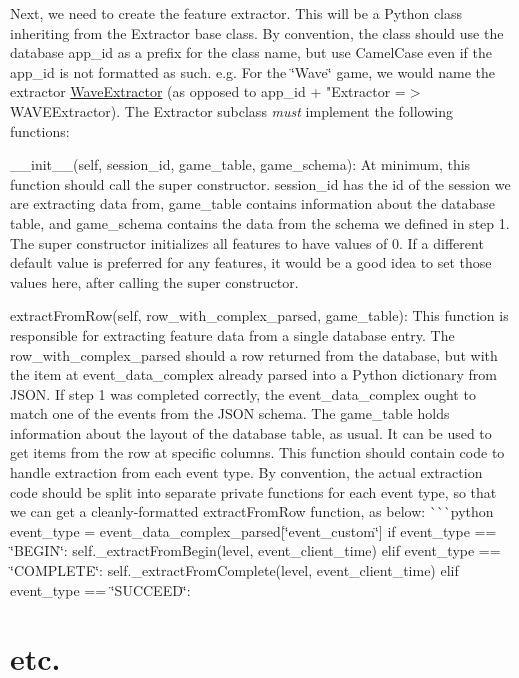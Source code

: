\begin{DoxyEnumerate}
\item Next, we need to create the feature extractor. This will be a Python class inheriting from the {\ttfamily Extractor} base class. By convention, the class should use the database app\+\_\+id as a prefix for the class name, but use Camel\+Case even if the app\+\_\+id is not formatted as such. e.\+g. For the \char`\"{}\+Wave\char`\"{} game, we would name the extractor {\ttfamily \mbox{\hyperlink{class_wave_extractor}{Wave\+Extractor}}} (as opposed to {\ttfamily app\+\_\+id + "Extractor} =$>$ {\ttfamily W\+A\+V\+E\+Extractor}). The {\ttfamily Extractor} subclass {\itshape must} implement the following functions\+:
\begin{DoxyItemize}
\item {\ttfamily \+\_\+\+\_\+init\+\_\+\+\_\+(self, session\+\_\+id, game\+\_\+table, game\+\_\+schema)}\+: At minimum, this function should call the super constructor. {\ttfamily session\+\_\+id} has the id of the session we are extracting data from, {\ttfamily game\+\_\+table} contains information about the database table, and {\ttfamily game\+\_\+schema} contains the data from the schema we defined in step 1. The super constructor initializes all features to have values of 0. If a different default value is preferred for any features, it would be a good idea to set those values here, after calling the super constructor.
\item {\ttfamily extract\+From\+Row(self, row\+\_\+with\+\_\+complex\+\_\+parsed, game\+\_\+table)}\+: This function is responsible for extracting feature data from a single database entry. The {\ttfamily row\+\_\+with\+\_\+complex\+\_\+parsed} should a row returned from the database, but with the item at {\ttfamily event\+\_\+data\+\_\+complex} already parsed into a Python dictionary from J\+S\+ON. If step 1 was completed correctly, the {\ttfamily event\+\_\+data\+\_\+complex} ought to match one of the {\ttfamily event}s from the J\+S\+ON schema. The {\ttfamily game\+\_\+table} holds information about the layout of the database table, as usual. It can be used to get items from the row at specific columns. This function should contain code to handle extraction from each {\ttfamily event} type. By convention, the actual extraction code should be split into separate private functions for each {\ttfamily event} type, so that we can get a cleanly-\/formatted {\ttfamily extract\+From\+Row} function, as below\+: \`{}\`{}\`{}python event\+\_\+type = event\+\_\+data\+\_\+complex\+\_\+parsed\mbox{[}\char`\"{}event\+\_\+custom\char`\"{}\mbox{]} if event\+\_\+type == \char`\"{}\+B\+E\+G\+I\+N\char`\"{}\+: self.\+\_\+extract\+From\+Begin(level, event\+\_\+client\+\_\+time) elif event\+\_\+type == \char`\"{}\+C\+O\+M\+P\+L\+E\+T\+E\char`\"{}\+: self.\+\_\+extract\+From\+Complete(level, event\+\_\+client\+\_\+time) elif event\+\_\+type == \char`\"{}\+S\+U\+C\+C\+E\+E\+D\char`\"{}\+: \section*{etc.}
\end{DoxyItemize}


\end{DoxyEnumerate}
